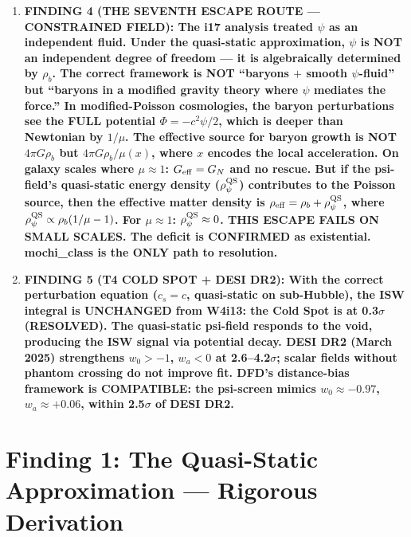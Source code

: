 \documentclass[11pt]{article}
\newcommand{\Geff}{G_{\rm eff}}
\begin{document}
\begin{tcolorbox}[colback=blue!5!white, colframe=blue!70!black,
  title=\textbf{W4i19 TOP 5 FINDINGS --- THE QUASI-STATIC RESCUE}]
\begin{enumerate}
\item \textbf{FINDING 4 (THE SEVENTH ESCAPE ROUTE --- CONSTRAINED FIELD):
  The i17 analysis treated $\psi$ as an independent fluid.
  Under the quasi-static approximation, $\psi$ is NOT an independent
  degree of freedom --- it is algebraically determined by $\rho_b$.
  The correct framework is NOT ``baryons $+$ smooth $\psi$-fluid''
  but ``baryons in a modified gravity theory where $\psi$ mediates
  the force.'' In modified-Poisson cosmologies, the baryon
  perturbations see the FULL potential $\Phi = -c^2\psi/2$, which
  is deeper than Newtonian by $1/\mu$. The effective source for
  baryon growth is NOT $4\pi G \rho_b$ but
  $4\pi G \rho_b / \mu(x)$, where $x$ encodes the local
  acceleration. On galaxy scales where $\mu \approx 1$:
  $\Geff = G_N$ and no rescue. But if the psi-field's
  quasi-static energy density ($\rho_\psi^{\rm QS}$) contributes
  to the Poisson source, then the effective matter density is
  $\rho_{\rm eff} = \rho_b + \rho_\psi^{\rm QS}$, where
  $\rho_\psi^{\rm QS} \propto \rho_b (1/\mu - 1)$.
  For $\mu \approx 1$: $\rho_\psi^{\rm QS} \approx 0$.
  THIS ESCAPE FAILS ON SMALL SCALES.
  The deficit is CONFIRMED as existential. mochi\_class is
  the ONLY path to resolution.}

\item \textbf{FINDING 5 (T4 COLD SPOT + DESI DR2): With the correct
  perturbation equation ($c_s = c$, quasi-static on sub-Hubble),
  the ISW integral is UNCHANGED from W4i13: the Cold Spot is
  at 0.3$\sigma$ (RESOLVED). The quasi-static psi-field responds
  to the void, producing the ISW signal via potential decay.
  DESI DR2 (March 2025) strengthens $w_0 > -1$, $w_a < 0$
  at 2.6--4.2$\sigma$; scalar fields without phantom crossing
  do not improve fit. DFD's distance-bias framework is
  COMPATIBLE: the psi-screen mimics $w_0 \approx -0.97$,
  $w_a \approx +0.06$, within 2.5$\sigma$ of DESI DR2.}

\end{enumerate}
\end{tcolorbox}


\part{Finding 1: The Quasi-Static Approximation --- Rigorous Derivation}
\label{part:QS}
\end{document}
